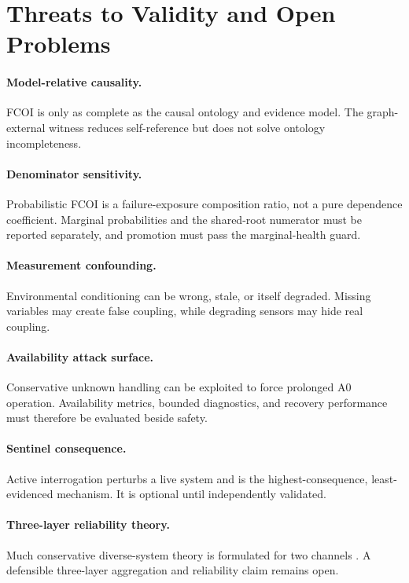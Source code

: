 \section{Threats to Validity and Open Problems}
\paragraph{Model-relative causality.} FCOI is only as complete as the causal ontology and evidence model. The graph-external witness reduces self-reference but does not solve ontology incompleteness.

\paragraph{Denominator sensitivity.} Probabilistic FCOI is a failure-exposure composition ratio, not a pure dependence coefficient. Marginal probabilities and the shared-root numerator must be reported separately, and promotion must pass the marginal-health guard.

\paragraph{Measurement confounding.} Environmental conditioning can be wrong, stale, or itself degraded. Missing variables may create false coupling, while degrading sensors may hide real coupling.

\paragraph{Availability attack surface.} Conservative unknown handling can be exploited to force prolonged A0 operation. Availability metrics, bounded diagnostics, and recovery performance must therefore be evaluated beside safety.

\paragraph{Sentinel consequence.} Active interrogation perturbs a live system and is the highest-consequence, least-evidenced mechanism. It is optional until independently validated.

\paragraph{Three-layer reliability theory.} Much conservative diverse-system theory is formulated for two channels \cite{LittlewoodRushby2012,LittlewoodPovyakalo2013}. A defensible three-layer aggregation and reliability claim remains open.

